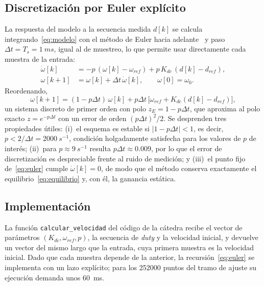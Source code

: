 \documentclass[journal,10pt,a4paper]{IEEEtran}
\begin{document}
\subsection{Discretización por Euler explícito}
La respuesta del modelo a la secuencia medida $d[k]$ se calcula integrando~\eqref{eq:modelo} con el método de Euler hacia adelante~\cite{butcher} y paso $\Delta t=T_s=\SI{1}{ms}$, igual al de muestreo, lo que permite usar directamente cada muestra de la entrada:
\begin{align}
\dot\omega[k]&=-p\,(\omega[k]-\omega_{ref})+p\,K_{dc}\,(d[k]-d_{ref}),\label{eq:wdot}\\
\omega[k+1]&=\omega[k]+\Delta t\,\dot\omega[k],\qquad \omega[0]=\omega_0.\label{eq:euler}
\end{align}
Reordenando,
\begin{equation}
\omega[k+1]=(1-p\Delta t)\,\omega[k]+p\Delta t\,\bigl[\omega_{ref}+K_{dc}(d[k]-d_{ref})\bigr],
\end{equation}
un sistema discreto de primer orden con polo $z_E=1-p\Delta t$, que aproxima al polo exacto $z=e^{-p\Delta t}$ con un error de orden $(p\Delta t)^2/2$. Se desprenden tres propiedades útiles: (i)~el esquema es estable si $|1-p\Delta t|<1$, es decir, $p<2/\Delta t=\SI{2000}{s^{-1}}$, condición holgadamente satisfecha para los valores de $p$ de interés; (ii)~para $p\approx\SI{9}{s^{-1}}$ resulta $p\Delta t\approx0.009$, por lo que el error de discretización es despreciable frente al ruido de medición; y (iii)~el punto fijo de~\eqref{eq:euler} cumple $\dot\omega[k]=0$, de modo que el método conserva exactamente el equilibrio~\eqref{eq:equilibrio} y, con él, la ganancia estática.

\subsection{Implementación}
La función \texttt{calcular\_velocidad} del código de la cátedra recibe el vector de parámetros $(K_{dc},\omega_{ref},p)$, la secuencia de \emph{duty} y la velocidad inicial, y devuelve un vector del mismo largo que la entrada, cuya primera muestra es la velocidad inicial. Dado que cada muestra depende de la anterior, la recursión~\eqref{eq:euler} se implementa con un lazo explícito; para los \num{252000} puntos del tramo de ajuste su ejecución demanda unos \SI{60}{ms}.
\end{document}
